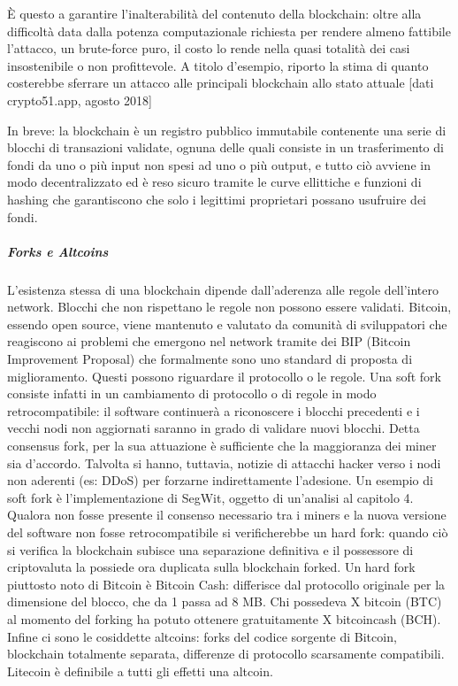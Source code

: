 È questo a garantire l’inalterabilità del contenuto della blockchain: oltre alla difficoltà data dalla potenza computazionale richiesta per rendere almeno fattibile l’attacco, un brute-force puro, il costo lo rende nella quasi totalità dei casi insostenibile o non profittevole.
A titolo d’esempio, riporto la stima di quanto costerebbe sferrare un attacco alle principali blockchain allo stato attuale [dati crypto51.app, agosto 2018]


In breve: la blockchain è un registro pubblico immutabile contenente una serie di blocchi di transazioni validate, ognuna delle quali consiste in un trasferimento di fondi da uno o più input non spesi ad uno o più output, e tutto ciò avviene in modo decentralizzato ed è reso sicuro tramite le curve ellittiche e funzioni di hashing che garantiscono che solo i legittimi proprietari possano usufruire dei fondi.







\subparagraph{Forks e Altcoins}

L’esistenza stessa di una blockchain dipende dall’aderenza alle regole dell’intero network. Blocchi che non rispettano le regole non possono essere validati.
Bitcoin, essendo open source, viene mantenuto e valutato da comunità di sviluppatori che reagiscono ai problemi che emergono nel network tramite dei BIP (Bitcoin Improvement Proposal) che formalmente sono uno standard di proposta di miglioramento. Questi possono riguardare il protocollo o le regole. Una soft fork consiste infatti in un cambiamento di protocollo o di regole in modo retrocompatibile: il software continuerà a riconoscere i blocchi precedenti e i vecchi nodi non aggiornati saranno in grado di validare nuovi blocchi. Detta consensus fork, per la sua attuazione è sufficiente che la maggioranza dei miner sia d’accordo. Talvolta si hanno, tuttavia, notizie di attacchi hacker verso i nodi non aderenti (es: DDoS) per forzarne indirettamente l’adesione. Un esempio di soft fork è l’implementazione di SegWit, oggetto di un’analisi al capitolo 4.
Qualora non fosse presente il consenso necessario tra i miners e la nuova versione del software non fosse retrocompatibile si verificherebbe un hard fork: quando ciò si verifica la blockchain subisce una separazione definitiva e il possessore di criptovaluta la possiede ora duplicata sulla blockchain forked.
Un hard fork piuttosto noto di Bitcoin è Bitcoin Cash: differisce dal protocollo originale per la dimensione del blocco, che da 1 passa ad 8 MB. Chi possedeva X bitcoin (BTC) al momento del forking ha potuto ottenere gratuitamente X bitcoincash (BCH).
Infine ci sono le cosiddette altcoins: forks del codice sorgente di Bitcoin, blockchain totalmente separata, differenze di protocollo scarsamente compatibili. Litecoin è definibile a tutti gli effetti una altcoin.




